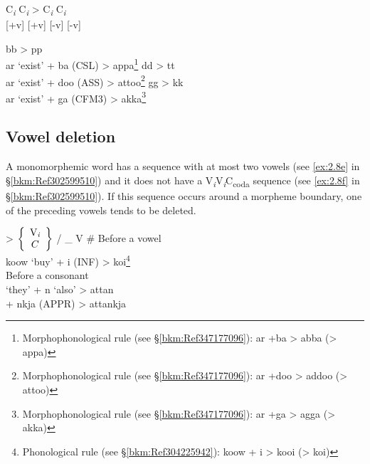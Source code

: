 \begin{exe}
\ex \gll C\textit{\textsubscript{i}}  C\textit{\textsubscript{i}}  >  C\textit{\textsubscript{i}}  C\textit{\textsubscript{i}}\footnotemark\\
 {[+v]}  [+v] {}   [-v]  [-v]\\
\ex\label{ex:2.20}
\begin{xlist}
\ex bb > pp\\
    ar   ‘exist’   +   ba   (CSL)   >   appa\footnote{Morphophonological rule (see §\ref{bkm:Ref347177096}): ar +ba > abba (> appa)}
\ex dd > tt\\
    ar   ‘exist’   +   doo   (ASS)   >   attoo\footnote{Morphophonological rule (see §\ref{bkm:Ref347177096}): ar +doo > addoo (> attoo)}
\ex gg > kk\\
    ar   ‘exist’   +   ga   (CFM3)   >   akka\footnote{Morphophonological rule (see §\ref{bkm:Ref347177096}): ar +ga > agga (> akka)}\\
\end{xlist}
\end{exe}

\subsection{Vowel deletion}
\label{bkm:Ref301832441}\hypertarget{RefHeadingToc395696982}{}
A monomorphemic word has a sequence with at most two vowels (see \ref{ex:2.8e} in §\ref{bkm:Ref302599510}) and it does not have a V\textit{\textsubscript{i}}V\textit{\textsubscript{i}}C\textsubscript{coda} sequence (see \ref{ex:2.8f} in §\ref{bkm:Ref302599510}). If this sequence occurs around a morpheme boundary, one of the preceding vowels tends to be deleted.

  {>}  $\left\{\begin{array}{c} \text{V\textit{\textsubscript{i}}} \\ C \end{array}  \right\}$  {/}  {\_} V    {\#}
\ex
\ea Before a vowel\\
   {koow}  {‘buy’}  {+}  {i}  {(INF)}  {>}  {koi\footnote{Phonological rule (see §\ref{bkm:Ref304225942}): koow + i > kooi (> koi)}}\\
\ex Before a consonant\\
     {‘they’}  {+}  {n}    {‘also’}   {>}  {attan}\\
        {}         {}      {+}  {nkja}  {(APPR)}  {>}  {attankja}\\
\z
\z

